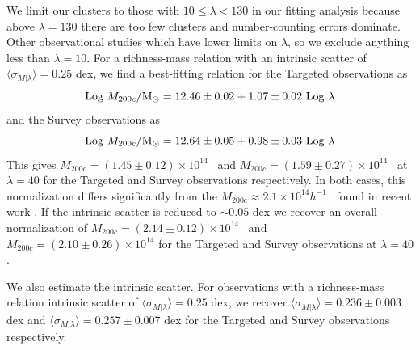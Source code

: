 \documentclass[fleqn,usenatbib]{mnras}
\begin{document}
We limit our clusters to those with $10 \leq \lambda < 130$ in our fitting analysis because above $\lambda=130$ there are too few clusters and number-counting errors dominate. Other observational studies  which have lower limits on $\lambda$, so we exclude anything less than $\lambda=10$. For a richness-mass relation with an intrinsic scatter of $\langle \sigma_{M|\lambda} \rangle = 0.25$ dex, we find a best-fitting relation for the Targeted observations as
\begin{equation}
	\mathrm{Log}\ M_{200c}/\hbox{$\mathrm{M}_\odot$} = 12.46\pm0.02 + 1.07\pm0.02\ \mathrm{Log}\ \lambda
\end{equation} 
and the Survey observations as
\begin{equation}
	\mathrm{Log}\ M_{200c}/\Msol = 12.64\pm0.05 + 0.98\pm0.03\ \mathrm{Log}\ \lambda
\end{equation} 
This gives $M_{200c} = (1.45\pm0.12)\times10^{14}$ \Msol\ and $M_{200c} = (1.59\pm0.27)\times10^{14}$ \Msol\ at $\lambda=40$ for the Targeted and Survey observations respectively. In both cases, this normalization differs significantly from the $M_{200c} \approx 2.1\times10^{14} h^{-1}$ \Msol\ found in recent work \cite{Li2016, Simet2016}. If the intrinsic scatter is reduced to $\sim 0.05$ dex we recover an overall normalization of $M_{200c} = (2.14\pm0.12)\times10^{14}$ \Msol\ and $M_{200c} = (2.10\pm0.26)\times10^{14}$ for the Targeted and Survey observations at $\lambda=40$.

We also estimate the intrinsic scatter. For observations with a richness-mass relation intrinsic scatter of $\langle \sigma_{M|\lambda} \rangle = 0.25$ dex, we recover $\langle \sigma_{M|\lambda} \rangle = 0.236\pm0.003$ dex and $\langle \sigma_{M|\lambda} \rangle = 0.257\pm0.007$ dex for the Targeted and Survey observations respectively. 

\end{document}
